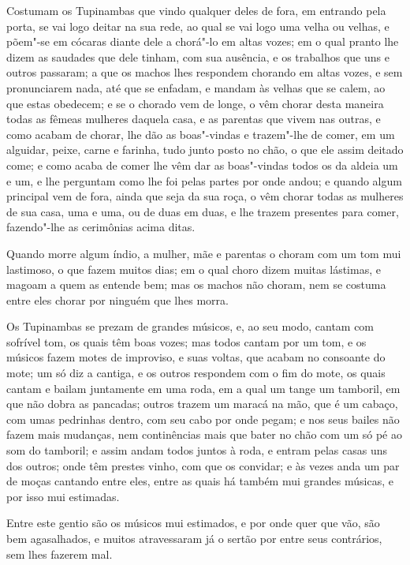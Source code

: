 Costumam os Tupinambas que vindo qualquer deles de fora, em entrando pela porta, se vai
logo deitar na sua rede, ao qual se vai logo uma velha ou velhas, e põem"-se em cócaras
diante dele a chorá"-lo em altas vozes; em o qual pranto lhe dizem as saudades que dele
tinham, com sua ausência, e os trabalhos que uns e outros passaram; a que os machos lhes
respondem chorando em altas vozes, e sem pronunciarem nada, até que se enfadam, e mandam
às velhas que se calem, ao que estas obedecem; e se o chorado vem de longe, o vêm chorar
desta maneira todas as fêmeas mulheres daquela casa, e as parentas que vivem nas outras, e
como acabam de chorar, lhe dão as boas"-vindas e trazem"-lhe de comer, em um alguidar,
peixe, carne e farinha, tudo junto posto no chão, o que ele assim deitado come; e como
acaba de comer lhe vêm dar as boas"-vindas todos os da aldeia um e um, e lhe perguntam como
lhe foi pelas partes por onde andou; e quando algum principal vem de fora, ainda que seja
da sua roça, o vêm chorar todas as mulheres de sua casa, uma e uma, ou de duas em duas, e
lhe trazem presentes para comer, fazendo"-lhe as cerimônias acima ditas.

Quando morre algum índio, a mulher, mãe e parentas o choram com um tom mui lastimoso, o
que fazem muitos dias; em o qual choro dizem muitas lástimas, e magoam a quem as entende
bem; mas os machos não choram, nem se costuma entre eles chorar por ninguém que lhes
morra.

Os Tupinambas se prezam de grandes músicos, e, ao seu modo, cantam com sofrível tom, os
quais têm boas vozes; mas todos cantam por um tom, e os músicos fazem motes de improviso,
e suas voltas, que acabam no consoante do mote; um só diz a cantiga, e os outros respondem
com o fim do mote, os quais cantam e bailam juntamente em uma roda, em a qual um tange um
tamboril, em que não dobra as pancadas; outros trazem um maracá na mão, que é um cabaço,
com umas pedrinhas dentro, com seu cabo por onde pegam; e nos seus bailes não fazem mais
mudanças, nem continências mais que bater no chão com um só pé ao som do tamboril; e assim
andam todos juntos à roda, e entram pelas casas uns dos outros; onde têm prestes vinho,
com que os convidar; e às vezes anda um par de moças cantando entre eles, entre as quais
há também mui grandes músicas, e por isso mui estimadas.

Entre este gentio são os músicos mui estimados, e por onde quer que vão, são bem
agasalhados, e muitos atravessaram já o sertão por entre seus contrários, sem lhes fazerem
mal.

